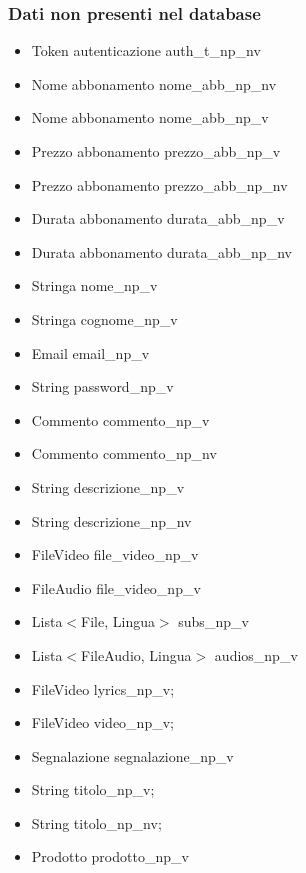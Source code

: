 \subsubsection{Dati non presenti nel database}
\begin{itemize}
    \item Token autenticazione auth\_t\_np\_nv
    \item Nome abbonamento nome\_abb\_np\_nv
    \item Nome abbonamento nome\_abb\_np\_v
    \item Prezzo abbonamento prezzo\_abb\_np\_v
    \item Prezzo abbonamento prezzo\_abb\_np\_nv
    \item Durata abbonamento durata\_abb\_np\_v
    \item Durata abbonamento durata\_abb\_np\_nv
    \item Stringa nome\_np\_v
    \item Stringa cognome\_np\_v
    \item Email email\_np\_v
    \item String password\_np\_v
    \item Commento commento\_np\_v
    \item Commento commento\_np\_nv
    \item String descrizione\_np\_v
    \item String descrizione\_np\_nv
    \item FileVideo file\_video\_np\_v
    \item FileAudio file\_video\_np\_v
    \item Lista$<$File, Lingua$>$ subs\_np\_v
    \item Lista$<$FileAudio, Lingua$>$ audios\_np\_v
    \item FileVideo lyrics\_np\_v;
    \item FileVideo video\_np\_v;
    \item Segnalazione segnalazione\_np\_v
    \item String titolo\_np\_v;
    \item String titolo\_np\_nv;
    \item Prodotto prodotto\_np\_v

\end{itemize}


